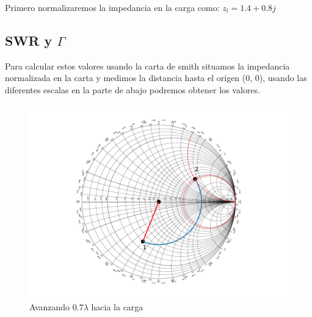 Primero normalizaremos la impedancia en la carga como: $z_l = 1.4 + 0.8j$
\subsection{SWR y $\Gamma$}
Para calcular estos valores usando la carta de smith situamos la impedancia normalizada en la carta y medimos la distancia hasta el origen (0, 0),  usando las diferentes escalas en la parte de abajo podremos obtener los valores.
\begin{figure}[h]
  \centering
  \includegraphics{ej6/images/out2.pdf}
  \caption{Avanzando $0.7\lambda$ hacia la carga}
  \label{ej2smith}
\end{figure}
